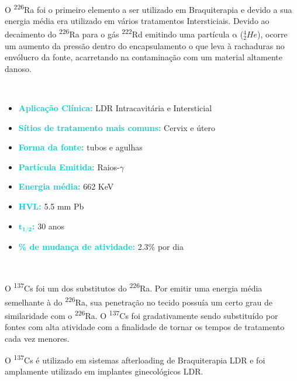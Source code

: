 \documentclass[11pt,a4paper]{article}
\begin{document}
			\

			O \textsuperscript{226}Ra foi o primeiro elemento a ser utilizado em Braquiterapia e devido a sua energia média era utilizado em vários tratamentos Intersticiais. Devido ao decaimento do \textsuperscript{226}Ra para o gás \textsuperscript{222}Rd emitindo uma partícula $\mathrm{\alpha}$ (${}_2^4He$), ocorre um aumento da pressão dentro do encapsulamento o que leva à rachaduras no envólucro da fonte, acarretando na contaminação com um material altamente danoso.

			\
		
	\begin{tcolorbox}[width=\textwidth, colback={white}, colbacktitle={DarkTurquoise!50!white}, title={$\bigstar$ \LobsterTwo{Césio 137} $\bigstar$}, coltitle={CarnationPink}, colframe={DarkTurquoise}, fonttitle=\rmfamily\bfseries\Large, breakable]
			\begin{itemize}
				\item \textcolor{DarkTurquoise}{\textbf{Aplicação Clínica:}} LDR Intracavitária e Intersticial
				\item \textcolor{DarkTurquoise}{\textbf{Sítios de tratamento mais comuns:}} Cervix e útero
				\item \textcolor{DarkTurquoise}{\textbf{Forma da fonte:}} tubos e agulhas
				\item \textcolor{DarkTurquoise}{\textbf{Partícula Emitida:}} Raios-$\gamma$
				\item \textcolor{DarkTurquoise}{\textbf{Energia média:}} 662 KeV
				\item \textcolor{DarkTurquoise}{\textbf{HVL:}} 5.5 mm Pb
				\item \textcolor{DarkTurquoise}{\textbf{$\mathbf{t_{1/2}}$:}} 30 anos
				\item \textcolor{DarkTurquoise}{\textbf{\% de mudança de atividade:}} 2.3\% por dia
			\end{itemize}
	\end{tcolorbox}
			\

			O \textsuperscript{137}Cs foi um dos substitutos do \textsuperscript{226}Ra. Por emitir uma energia média semelhante à do \textsuperscript{226}Ra, sua penetração no tecido possuía um certo grau de similaridade com o \textsuperscript{226}Ra. O \textsuperscript{137}Cs foi gradativamente sendo substituído por fontes com alta atividade com a finalidade de tornar os tempos de tratamento cada vez menores.

			O \textsuperscript{137}Cs é utilizado em sistemas afterloading de Braquiterapia LDR e foi amplamente utilizado em implantes ginecológicos LDR.
\end{document}

